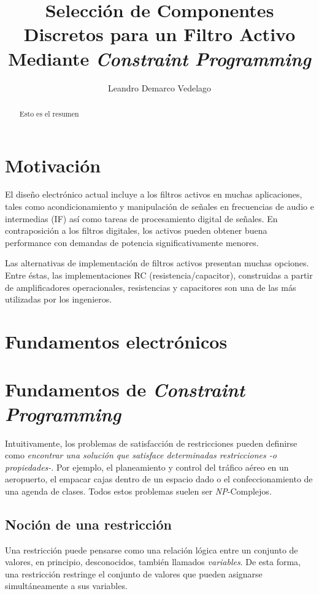 \documentclass{llncs}
\title{Selecci\'on de Componentes Discretos para un Filtro Activo Mediante \textit{Constraint Programming}}
\author{Leandro Demarco Vedelago}
\institute{
            \email{leandrodemarco@gmail.com}\\
            Universidad Nacional de C\'ordoba, Fa.M.A.F
          }
\begin{document}
{\def\addcontentsline#1#2#3{}\maketitle
  \noindent
  }
  
\begin{abstract}
  Esto es el resumen 
\end{abstract}

\tableofcontents
\newpage
  \section{\textbf{Motivaci\'on}}
    \label{sec:motivacion}
    El dise\~no electr\'onico actual incluye a los filtros activos en muchas aplicaciones,
    tales como acondicionamiento y manipulaci\'on de se\~nales en frecuencias de audio e
    intermedias (IF) as\'i como tareas de procesamiento digital de se\~nales. En
    contraposici\'on a los filtros digitales, los activos pueden obtener buena performance
    con demandas de potencia significativamente menores.
    
    Las alternativas de implementaci\'on de filtros activos presentan muchas opciones.
    Entre \'estas, las implementaciones RC (resistencia/capacitor), construidas a partir de
    amplificadores operacionales, resistencias y capacitores son una de las m\'as utilizadas
    por los ingenieros.\cite{corr}
    
  \section{\textbf{Fundamentos electr\'onicos}}
    \label{sec:fundelect}
    
  \section{\textbf{Fundamentos de \textit{Constraint Programming}}}
    \label{sec:fundprog}
    Intuitivamente, los problemas de satisfacci\'on de restricciones pueden definirse como \textit{encontrar
    una soluci\'on que satisface determinadas restricciones -o propiedades-}.
    Por ejemplo, el planeamiento y control del tr\'afico a\'ereo en un aeropuerto, el empacar cajas dentro de un
    espacio dado o el confeccionamiento de una agenda de clases. 
    Todos estos problemas suelen ser \textit{NP}-Complejos.
    
    \subsection{Noci\'on de una restricci\'on}
      Una restricci\'on puede pensarse como una relaci\'on l\'ogica entre un conjunto de valores, en principio,
      desconocidos, tambi\'en llamados \textit{variables}. De esta forma, una restricci\'on restringe el conjunto
      de valores que pueden asignarse simult\'aneamente a sus variables.
      
\end{document}
